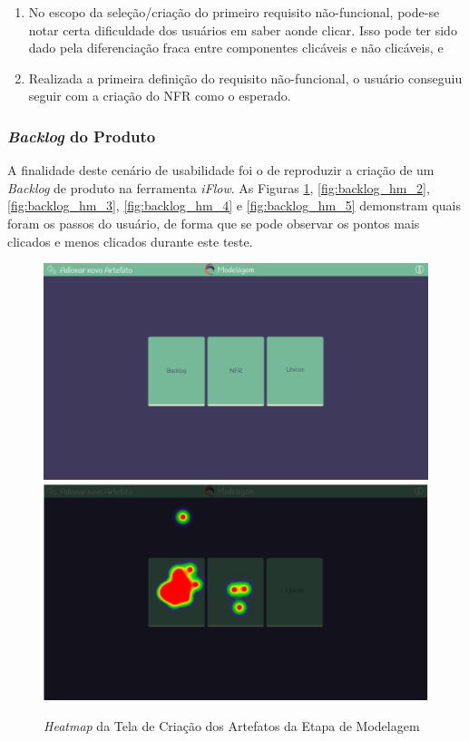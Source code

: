 \begin{enumerate}
    \item No escopo da seleção/criação do primeiro requisito não-funcional, pode-se notar certa dificuldade dos usuários em saber aonde clicar. Isso pode ter sido dado pela diferenciação fraca entre componentes clicáveis e não clicáveis, e
    \item Realizada a primeira definição do requisito não-funcional, o usuário conseguiu seguir com a criação do NFR como o esperado.
\end{enumerate}


\subsubsection{\textit{Backlog} do Produto}

A finalidade deste cenário de usabilidade foi o de reproduzir a criação de um \textit{Backlog} de produto na ferramenta \textit{iFlow}. As Figuras \ref{fig:backlog_hm_1}, \ref{fig:backlog_hm_2}, \ref{fig:backlog_hm_3}, \ref{fig:backlog_hm_4} e \ref{fig:backlog_hm_5} demonstram quais foram os passos do usuário, de forma que se pode observar os pontos mais clicados e menos clicados durante este teste.

\begin{figure}[]
  \begin{center}
      \caption{{\textit{Heatmap} da Tela de Criação dos Artefatos da Etapa de Modelagem}}
      \label{fig:backlog_hm_1}
      \includegraphics[scale=0.45]{figuras/UsabilityHub/backlog/1.png}
      \includegraphics[scale=0.45]{figuras/UsabilityHub/backlog/2.png}
  \end{center}
\end{figure}

